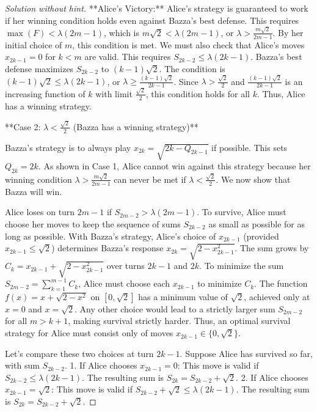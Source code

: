 \begin{proof} [Solution without hint]
**Alice's Victory:**
Alice's strategy is guaranteed to work if her winning condition holds even against Bazza's best defense. This requires $\max(F) < \lambda(2m-1)$, which is $m\sqrt{2} < \lambda(2m-1)$, or $\lambda > \frac{m\sqrt{2}}{2m-1}$. By her initial choice of $m$, this condition is met. We must also check that Alice's moves $x_{2k-1}=0$ for $k<m$ are valid. This requires $S_{2k-2} \le \lambda(2k-1)$. Bazza's best defense maximizes $S_{2k-2}$ to $(k-1)\sqrt{2}$. The condition is $(k-1)\sqrt{2} \le \lambda(2k-1)$, or $\lambda \ge \frac{(k-1)\sqrt{2}}{2k-1}$. Since $\lambda > \frac{\sqrt{2}}{2}$ and $\frac{(k-1)\sqrt{2}}{2k-1}$ is an increasing function of $k$ with limit $\frac{\sqrt{2}}{2}$, this condition holds for all $k$. Thus, Alice has a winning strategy.

**Case 2: $\lambda < \frac{\sqrt{2}}{2}$ (Bazza has a winning strategy)**

Bazza's strategy is to always play $x_{2k} = \sqrt{2k - Q_{2k-1}}$ if possible. This sets $Q_{2k}=2k$. As shown in Case 1, Alice cannot win against this strategy because her winning condition $\lambda > \frac{m\sqrt{2}}{2m-1}$ can never be met if $\lambda < \frac{\sqrt{2}}{2}$. We now show that Bazza will win.

Alice loses on turn $2m-1$ if $S_{2m-2} > \lambda(2m-1)$. To survive, Alice must choose her moves to keep the sequence of sums $S_{2k-2}$ as small as possible for as long as possible.
With Bazza's strategy, Alice's choice of $x_{2k-1}$ (provided $x_{2k-1} \le \sqrt{2}$) determines Bazza's response $x_{2k}=\sqrt{2-x_{2k-1}^2}$. The sum grows by $C_k = x_{2k-1} + \sqrt{2-x_{2k-1}^2}$ over turns $2k-1$ and $2k$.
To minimize the sum $S_{2m-2} = \sum_{k=1}^{m-1} C_k$, Alice must choose each $x_{2k-1}$ to minimize $C_k$. The function $f(x)=x+\sqrt{2-x^2}$ on $[0, \sqrt{2}]$ has a minimum value of $\sqrt{2}$, achieved only at $x=0$ and $x=\sqrt{2}$. Any other choice would lead to a strictly larger sum $S_{2m-2}$ for all $m>k+1$, making survival strictly harder. Thus, an optimal survival strategy for Alice must consist only of moves $x_{2k-1} \in \{0, \sqrt{2}\}$.

Let's compare these two choices at turn $2k-1$. Suppose Alice has survived so far, with sum $S_{2k-2}$.
1.  If Alice chooses $x_{2k-1}=0$: This move is valid if $S_{2k-2} \le \lambda(2k-1)$. The resulting sum is $S_{2k} = S_{2k-2} + \sqrt{2}$.
2.  If Alice chooses $x_{2k-1}=\sqrt{2}$: This move is valid if $S_{2k-2}+\sqrt{2} \le \lambda(2k-1)$. The resulting sum is $S_{2k} = S_{2k-2} + \sqrt{2}$.


\end{proof}
